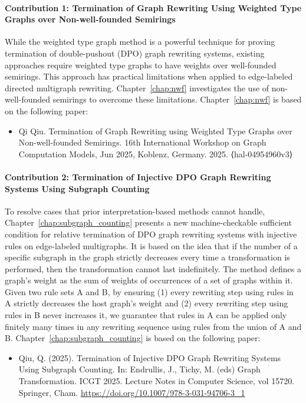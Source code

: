 \paragraph{Contribution 1: Termination of Graph Rewriting Using Weighted Type Graphs over Non-well-founded Semirings}
While the weighted type graph method is a powerful technique for proving termination of double-pushout (DPO) graph rewriting systems, existing approaches require weighted type graphs to have weights over well-founded semirings. This approach has practical limitations when applied to edge-labeled directed multigraph rewriting. Chapter~\ref{chap:nwf} investigates the use of non-well-founded semirings to overcome these limitations. Chapter~\ref{chap:nwf} is based on the following paper:
\begin{itemize}
    \item Qi Qiu. Termination of Graph Rewriting using Weighted Type Graphs over Non-well-founded Semirings. 16th International Workshop on Graph Computation Models, Jun 2025, Koblenz, Germany. 2025. ⟨hal-04954960v3⟩
\end{itemize}
 
\paragraph{Contribution 2: Termination of Injective DPO Graph Rewriting Systems Using Subgraph Counting} 
To resolve cases that prior interpretation-based methods cannot handle, Chapter~\ref{chap:subgraph_counting} presents a new machine-checkable sufficient condition for relative termination of DPO graph rewriting systems with injective rules on edge-labeled multigraphs. 
It is based on the idea that if the number of a specific subgraph in the graph strictly decreases every time a transformation is performed, then the transformation cannot last indefinitely.
The method defines a graph's weight as the sum of weights of occurrences of a set of graphs within it. Given two rule sets A and B, by ensuring 
(1) every rewriting step using rules in A strictly decreases the host graph's weight and 
(2) every rewriting step using rules in B never increases it, we guarantee that rules in A can be applied only finitely many times in any rewriting sequence using rules from the union of A and B. 
Chapter~\ref{chap:subgraph_counting} is based on the following paper:
\begin{itemize}
    \item Qiu, Q. (2025). Termination of Injective DPO Graph Rewriting Systems Using Subgraph Counting. In: Endrullis, J., Tichy, M. (eds) Graph Transformation. ICGT 2025. Lecture Notes in Computer Science, vol 15720. Springer, Cham. \url{https://doi.org/10.1007/978-3-031-94706-3_1}
\end{itemize}

